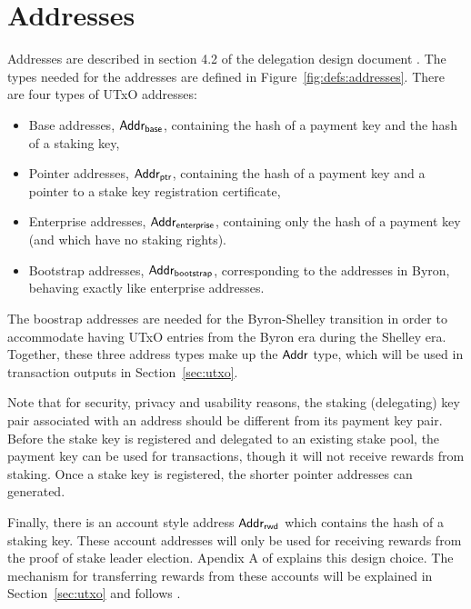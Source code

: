 \section{Addresses}
\label{sec:addresses}

Addresses are described in section 4.2 of the delegation design document \cite{delegation_design}.
The types needed for the addresses are defined in Figure~\ref{fig:defs:addresses}.
There are four types of UTxO addresses:
\begin{itemize}
  \item Base addresses, $\mathsf{Addr_{base}}$,
        containing the hash of a payment key and the hash of a staking key,
  \item Pointer addresses, $\mathsf{Addr_{ptr}}$,
        containing the hash of a payment key and a pointer to a stake key registration certificate,
  \item Enterprise addresses, $\mathsf{Addr_{enterprise}}$,
        containing only the hash of a payment key (and which have no staking rights).
  \item Bootstrap addresses, $\mathsf{Addr_{bootstrap}}$,
        corresponding to the addresses in Byron, behaving exactly like enterprise addresses.
\end{itemize}

The boostrap addresses are needed for the Byron-Shelley transition in order to
accommodate having UTxO entries from the Byron era during the Shelley era.
Together, these three address types make up the $\mathsf{Addr}$ type, which will be used
in transaction outputs in Section~\ref{sec:utxo}.

Note that for security, privacy and usability reasons, the staking (delegating)
key pair associated with an address should be different from its payment key pair.
Before the stake key is registered and delegated to an existing stake pool,
the payment key can be used for transactions, though it will not receive rewards from staking.
Once a stake key is registered, the shorter pointer addresses can generated.

Finally, there is an account style address $\mathsf{Addr_{rwd}}$ which contains the hash of a staking key.
These account addresses will only be used for receiving rewards from the proof of
stake leader election.  Apendix A of \cite{delegation_design} explains this design choice.
The mechanism for transferring rewards from these accounts will be explained in
Section~\ref{sec:utxo} and follows \cite{chimeric}.

